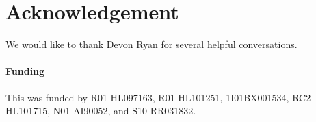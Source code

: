 \documentclass{bioinfo}
\begin{document}
\section*{Acknowledgement}
We would like to thank Devon Ryan for several helpful conversations.

\paragraph{Funding\textcolon} This was funded by R01 HL097163, R01 HL101251, 1I01BX001534, RC2 HL101715, N01 AI90052, and S10 RR031832.

%
%
%
%
%
%
%
%
%



    
\end{document}
